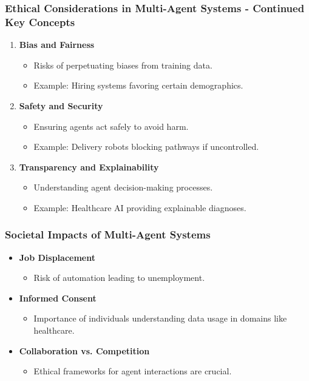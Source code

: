 \documentclass[aspectratio=169]{beamer}
\begin{document}
\begin{frame}[fragile]
  \frametitle{Ethical Considerations in Multi-Agent Systems - Continued Key Concepts}
  \begin{enumerate}[resume]
    \item \textbf{Bias and Fairness}
      \begin{itemize}
        \item Risks of perpetuating biases from training data.
        \item Example: Hiring systems favoring certain demographics.
      \end{itemize}
    \item \textbf{Safety and Security}
      \begin{itemize}
        \item Ensuring agents act safely to avoid harm.
        \item Example: Delivery robots blocking pathways if uncontrolled.
      \end{itemize}
    \item \textbf{Transparency and Explainability}
      \begin{itemize}
        \item Understanding agent decision-making processes.
        \item Example: Healthcare AI providing explainable diagnoses.
      \end{itemize}
  \end{enumerate}
\end{frame}

\begin{frame}[fragile]
  \frametitle{Societal Impacts of Multi-Agent Systems}
  \begin{itemize}
    \item \textbf{Job Displacement} 
      \begin{itemize}
        \item Risk of automation leading to unemployment.
      \end{itemize}
    \item \textbf{Informed Consent}
      \begin{itemize}
        \item Importance of individuals understanding data usage in domains like healthcare.
      \end{itemize}
    \item \textbf{Collaboration vs. Competition}
      \begin{itemize}
        \item Ethical frameworks for agent interactions are crucial.
      \end{itemize}
  \end{itemize}
\end{frame}
\end{document}
